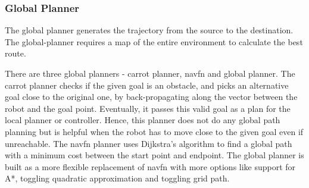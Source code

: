 \documentclass[12pt]{article}
\begin{document}
\subsubsection{Global Planner}
\par The global planner generates the trajectory from the source to the destination. The global-planner requires a map of the entire environment to calculate the best route.
\par There are three global planners - carrot planner, navfn and global planner. The carrot planner checks if the given goal is an obstacle, and picks an alternative goal close to the original one, by back-propagating along the vector between the robot and the goal point. Eventually, it passes this valid goal as a plan for the local planner or controller. Hence, this planner does not do any global path planning but is helpful when the robot has to move close to the given goal even if unreachable. The navfn planner uses Dijkstra's algorithm to find a global path with a minimum cost between the start point and endpoint. The global planner is built as a more flexible replacement of navfn with more options like support for A*, toggling quadratic approximation and toggling grid path.
\end{document}
